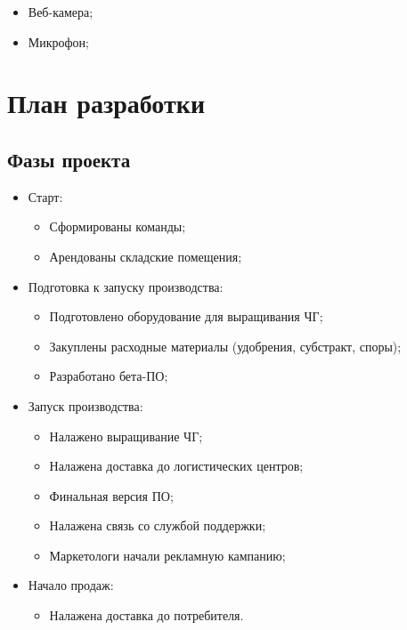 \documentclass[a4paper,10pt]{article}
\begin{document}
    \begin{itemize}
        \item Веб-камера;
        \item Микрофон;
    \end{itemize}

\section{План разработки}

\subsection{Фазы проекта}

    \begin{itemize}
        \item Старт:
            \begin{itemize}
                \item Сформированы команды;
                \item Арендованы складские помещения;
            \end{itemize}

        \item Подготовка к запуску производства:
            \begin{itemize}
                \item Подготовлено оборудование для выращивания ЧГ;
                \item Закуплены расходные материалы (удобрения, субстракт, споры);
                \item Разработано бета-ПО;
            \end{itemize}


        \item Запуск производства:
            \begin{itemize}
            \item Налажено выращивание ЧГ;
            \item Налажена доставка до логистических центров;
            \item Финальная версия ПО;
            \item Налажена связь со службой поддержки;
            \item Маркетологи начали рекламную кампанию;
            \end{itemize}

        \item Начало продаж:
            \begin{itemize}
                \item Налажена доставка до потребителя.
            \end{itemize}

    \end{itemize}
\end{document}
